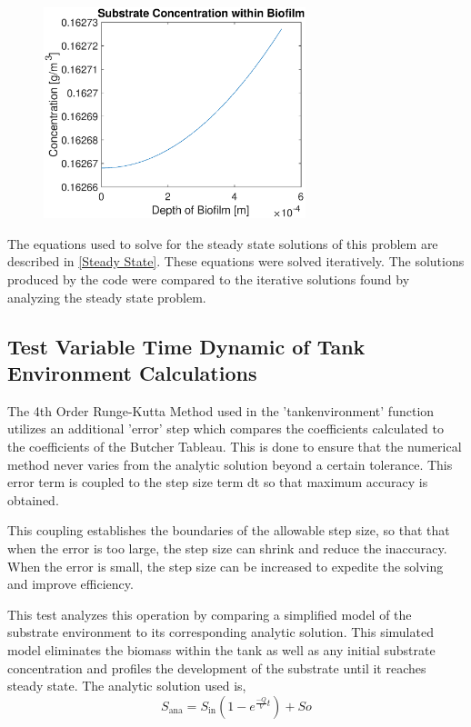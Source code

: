 \documentclass[letterpaper, twoside]{article}
\numberwithin{equation}{section}
\begin{document}
\begin{figure}[H]
  \centering
  \includegraphics[read=eps, width=3in]{SteadyState_Figure1.eps}
\end{figure}

The equations used to solve for the steady state solutions of this problem are described in \ref{Steady State}. These equations were solved iteratively. The solutions produced by the code were compared to the iterative solutions found by analyzing the steady state problem.


\subsection{Test Variable Time Dynamic of Tank Environment Calculations}
The 4th Order Runge-Kutta Method used in the 'tankenvironment' function utilizes an additional 'error' step which compares the coefficients calculated to the coefficients of the Butcher Tableau. This is done to ensure that the numerical method never varies from the analytic solution beyond a certain tolerance. This error term is coupled to the step size term dt so that maximum accuracy is obtained. 

This coupling establishes the boundaries of the allowable step size, so that that when the error is too large, the step size can shrink and reduce the inaccuracy. When the error is small, the step size can be increased to expedite the solving and improve efficiency. 

This test analyzes this operation by comparing a simplified model of the substrate environment to its corresponding analytic solution. This simulated model eliminates the biomass within the tank as well as any initial substrate concentration and profiles the development of the substrate until it reaches steady state. The analytic solution used is,
\begin{equation} \label{eq: S_ana}
  S_\mathrm{ana}=S_\mathrm{in}{(1-e^{\frac{-Q}{V}t})} + So
\end{equation}
\end{document}
